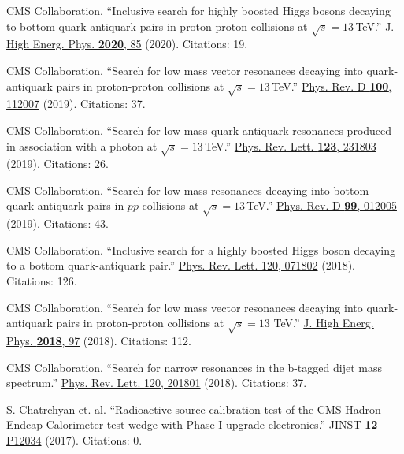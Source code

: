 \documentclass[12pt]{article} %
\begin{document}
\smallskip

CMS Collaboration. ``Inclusive search for highly boosted Higgs bosons decaying to bottom quark-antiquark pairs in proton-proton collisions at $\sqrt{s}=13$\,TeV.'' \href{https://doi.org/10.1007/JHEP12(2020)085}{J. High Energ. Phys. \textbf{2020}, 85} (2020). Citations: 19.

\smallskip

CMS Collaboration. ``Search for low mass vector resonances decaying into quark-antiquark pairs in proton-proton collisions at $\sqrt{s}=13$\,TeV.'' \href{https://doi.org/10.1103/PhysRevD.100.112007}{Phys. Rev. D \textbf{100}, 112007} (2019). Citations: 37.

\smallskip

CMS Collaboration. ``Search for low-mass quark-antiquark resonances produced in association with a photon at $\sqrt{s}=13$\,TeV.'' \href{https://doi.org/10.1103/PhysRevLett.123.231803}{Phys. Rev. Lett. \textbf{123}, 231803} (2019). Citations: 26.

\smallskip

CMS Collaboration. ``Search for low mass resonances decaying into bottom quark-antiquark pairs in $pp$ collisions at $\sqrt{s}=13$\,TeV.'' \href{https://doi.org/10.1103/PhysRevD.99.012005}{Phys. Rev. D \textbf{99}, 012005} (2019). Citations: 43.

\smallskip

CMS Collaboration. ``Inclusive search for a highly boosted Higgs boson decaying to a bottom quark-antiquark pair.'' \href{https://doi.org/10.1103/PhysRevLett.120.071802}{Phys. Rev. Lett. 120, 071802} (2018). Citations: 126.

\smallskip

CMS Collaboration. ``Search for low mass vector resonances decaying into quark-antiquark pairs in proton-proton collisions at $\sqrt{s}=13 $ TeV.'' \href{https://doi.org/10.1007/JHEP01(2018)097}{J. High Energ. Phys. \textbf{2018}, 97} (2018). Citations: 112.

\smallskip

CMS Collaboration. ``Search for narrow resonances in the b-tagged dijet mass spectrum.'' \href{https://doi.org/10.1103/PhysRevLett.120.201801}{Phys. Rev. Lett. 120, 201801} (2018). Citations: 37.

\smallskip

S. Chatrchyan et. al. ``Radioactive source calibration test of the CMS Hadron Endcap Calorimeter test wedge with Phase I upgrade electronics.'' \href{https://doi.org/10.1088/1748-0221/12/12/P12034}{JINST \textbf{12} P12034} (2017). Citations: 0.
\end{document}

